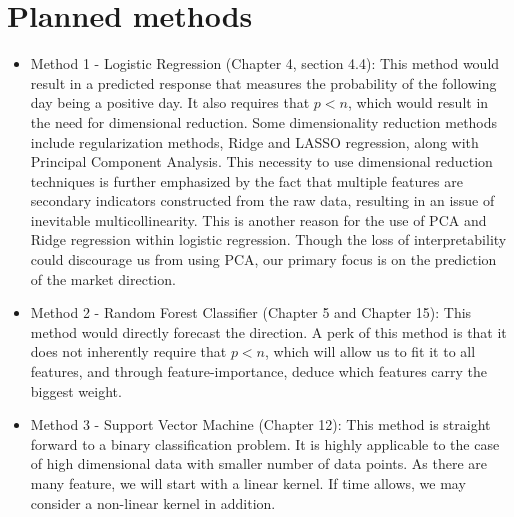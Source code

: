 \documentclass[11pt]{article}
\begin{document}
\section{Planned methods}
\begin{itemize}
    \item Method 1 - Logistic Regression (Chapter 4, section 4.4): This method would result in a predicted response that measures the probability of the following day being a positive day. It also requires that $p<n$, which would result in the need for dimensional reduction. Some dimensionality reduction methods include regularization methods, Ridge and LASSO regression, along with Principal Component Analysis. This necessity to use dimensional reduction techniques is further emphasized by the fact that multiple features are secondary indicators constructed from the raw data, resulting in an issue of inevitable multicollinearity. This is another reason for the use of PCA and Ridge regression within logistic regression. Though the loss of interpretability could discourage us from using PCA, our primary focus is on the prediction of the market direction. 
    \item Method 2 - Random Forest Classifier (Chapter 5 and Chapter 15): This method would directly forecast the direction. A perk of this method is that it does not inherently require that $p<n$, which will allow us to fit it to all features, and through feature-importance, deduce which features carry the biggest weight. 
    \item Method 3 - Support Vector Machine (Chapter 12): This method is straight forward to a binary classification problem. It is highly applicable to the case of high dimensional data with smaller number of data points. As there are many feature, we will start with a linear kernel. If time allows, we may consider a non-linear kernel in addition.
    

\end{itemize}
\end{document}

